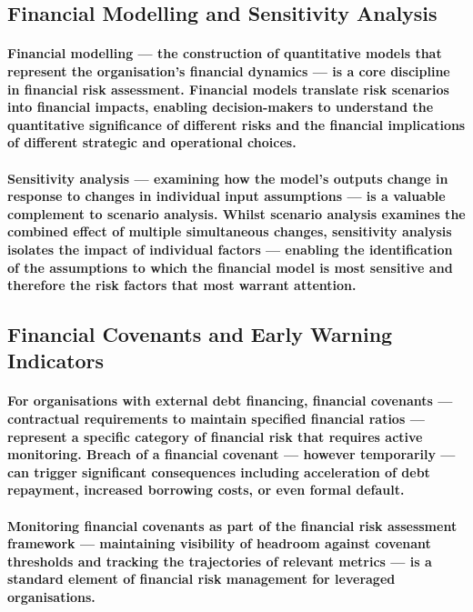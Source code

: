 \subsection{Financial Modelling and Sensitivity Analysis}
\paragraph{\textbf{Financial modelling} — the construction of quantitative models that represent the organisation's financial dynamics — is a core discipline in financial risk assessment. Financial models translate risk scenarios into financial impacts, enabling decision-makers to understand the quantitative significance of different risks and the financial implications of different strategic and operational choices.}
\paragraph{\textbf{Sensitivity analysis} — examining how the model's outputs change in response to changes in individual input assumptions — is a valuable complement to scenario analysis. Whilst scenario analysis examines the combined effect of multiple simultaneous changes, sensitivity analysis isolates the impact of individual factors — enabling the identification of the assumptions to which the financial model is most sensitive and therefore the risk factors that most warrant attention.}

\subsection{Financial Covenants and Early Warning Indicators}
\paragraph{For organisations with external debt financing, \textbf{financial covenants} — contractual requirements to maintain specified financial ratios — represent a specific category of financial risk that requires active monitoring. Breach of a financial covenant — however temporarily — can trigger significant consequences including acceleration of debt repayment, increased borrowing costs, or even formal default.}
\paragraph{Monitoring financial covenants as part of the financial risk assessment framework — maintaining visibility of headroom against covenant thresholds and tracking the trajectories of relevant metrics — is a standard element of financial risk management for leveraged organisations.}
